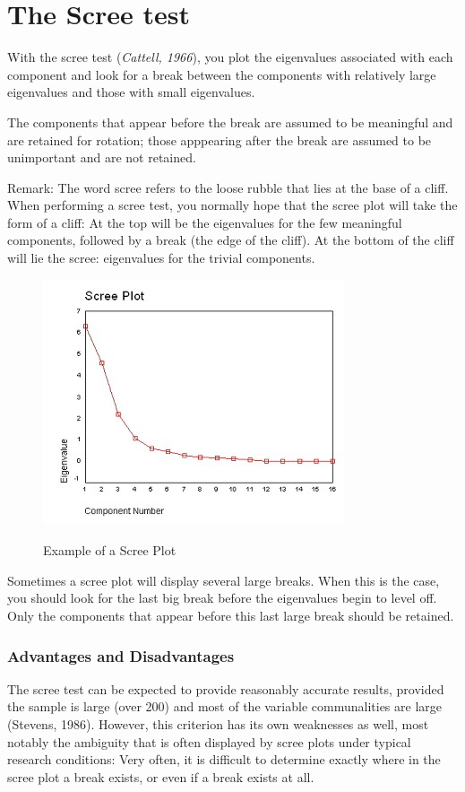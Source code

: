 \documentclass[]{article}
\begin{document}
\section{The Scree test} With the scree test (\textit{Cattell, 1966}), you plot the eigenvalues associated with
each component and look for a break between the components with relatively large
eigenvalues and those with small eigenvalues.  


The components that appear before the break are
assumed to be meaningful and are retained for rotation; those apppearing after the break are
assumed to be unimportant and are not retained.

Remark: The word scree refers to the loose rubble that lies at
the base of a cliff.  When performing a scree test, you normally hope that the scree plot
will take the form of a cliff:  At the top will be the eigenvalues for the few meaningful
components, followed by a break (the edge of the cliff).  At the bottom of the cliff will lie
the scree:  eigenvalues for the trivial components.

\begin{figure}[h!]
	\begin{center}
		\includegraphics[scale=1.0]{3AScree1.jpg}\\
		\caption{Example of a Scree Plot}\label{Scree Plot}
	\end{center}
	
\end{figure}


Sometimes a scree plot will display several large breaks.  When this is the case, you should look
for the last big break before the eigenvalues begin to level off. Only the components that appear
before this last large break should be retained.
\newpage
\subsubsection{Advantages and Disadvantages}
The scree test can be expected to provide reasonably accurate results, provided the sample is
large (over 200) and most of the variable communalities are large (Stevens, 1986).  However,
this criterion has its own weaknesses as well, most notably the ambiguity that is often displayed
by scree plots under typical research conditions:  Very often, it is difficult to determine exactly
where in the scree plot a break exists, or even if a break exists at all.
\end{document}
